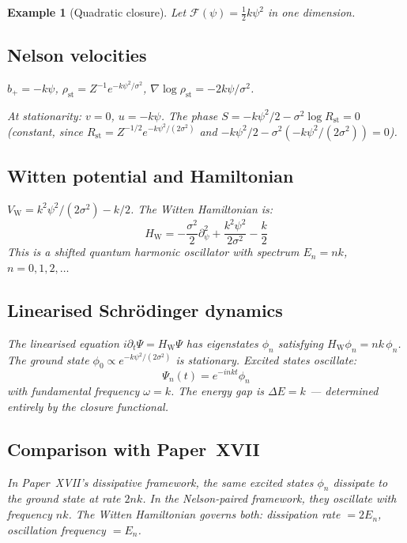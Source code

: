 \documentclass[12pt]{article}
\newtheorem{example}[theorem]{Example}
\newcommand{\Fcal}{\mathcal{F}}
\newcommand{\VW}{V_{\mathrm{W}}}
\begin{document}
\begin{example}[Quadratic closure]\label{ex:quadratic}
Let $\Fcal(\psi) = \frac{1}{2}k\psi^2$ in one dimension.

\subsection*{Nelson velocities}

$b_+ = -k\psi$, $\rho_{\mathrm{st}} = Z^{-1}e^{-k\psi^2/\sigma^2}$, $\nabla\log\rho_{\mathrm{st}} = -2k\psi/\sigma^2$.

At stationarity: $v = 0$, $u = -k\psi$. The phase $S = -k\psi^2/2 - \sigma^2\log R_{\mathrm{st}} = 0$ (constant, since $R_{\mathrm{st}} = Z^{-1/2}e^{-k\psi^2/(2\sigma^2)}$ and $-k\psi^2/2 - \sigma^2(-k\psi^2/(2\sigma^2)) = 0$).

\subsection*{Witten potential and Hamiltonian}

$\VW = k^2\psi^2/(2\sigma^2) - k/2$. The Witten Hamiltonian is:
\begin{equation}
    H_{\mathrm{W}} = -\frac{\sigma^2}{2}\partial_\psi^2 + \frac{k^2\psi^2}{2\sigma^2} - \frac{k}{2}
\end{equation}
This is a shifted quantum harmonic oscillator with spectrum $E_n = nk$, $n = 0, 1, 2, \ldots$

\subsection*{Linearised Schr\"odinger dynamics}

The linearised equation $i\partial_t\Psi = H_{\mathrm{W}}\Psi$ has eigenstates $\phi_n$ satisfying $H_{\mathrm{W}}\phi_n = nk\,\phi_n$. The ground state $\phi_0 \propto e^{-k\psi^2/(2\sigma^2)}$ is stationary. Excited states oscillate:
\begin{equation}
    \Psi_n(t) = e^{-inkt}\phi_n
\end{equation}
with fundamental frequency $\omega = k$. The energy gap is $\Delta E = k$ --- determined entirely by the closure functional.

\subsection*{Comparison with Paper~XVII}

In Paper~XVII's dissipative framework, the same excited states $\phi_n$ dissipate to the ground state at rate $2nk$. In the Nelson-paired framework, they oscillate with frequency $nk$. The Witten Hamiltonian governs both: dissipation rate $= 2E_n$, oscillation frequency $= E_n$.


\end{example}
\end{document}
